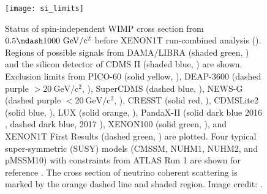 \begin{figure}
\centering
\texttt{[image: si\_limits]}
\caption{Status of spin-independent WIMP cross section from $0.5 \mdash 1000\ \mathrm{GeV/c^2}$ before XENON1T run-combined analysis
().  Regions of possible signals from DAMA/LIBRA (shaded green, ) and the silicon
detector of CDMS II (shaded blue, ) are shown.  Exclusion limits from PICO-60 (solid yellow, ),
DEAP-3600 (dashed purple $> 20\ \mathrm{GeV/c^2}$,
), SuperCDMS (dashed blue, ), NEWS-G (dashed purple $< 20\ \mathrm{GeV/c^2}$,
), CRESST (solid red, ), CDMSLite2 (solid blue, ), LUX
(solid orange, ), PandaX-II (solid dark blue 2016
, dashed dark blue, 2017 ), XENON100 (solid green, ), and
XENON1T First Results (dashed green, ) are plotted.  Four typical super-symmetric (SUSY) models (CMSSM, NUHM1, NUHM2,
and pMSSM10) with constraints from ATLAS Run
1 are shown for reference .  The cross section of neutrino coherent scattering is marked by the orange dashed
line and shaded region.  Image credit: .}
\label{fig:si_limits}
\end{figure}


